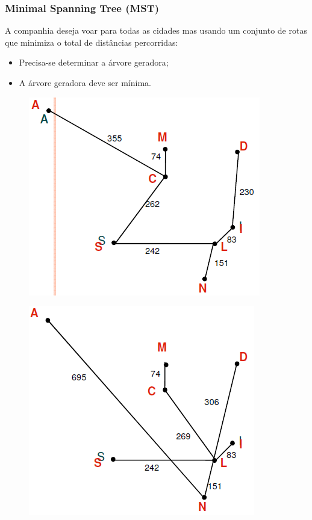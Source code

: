 \documentclass[hyperref={pdfpagelabels=false}]{beamer}
\begin{document}
\begin{frame}
\frametitle{Minimal Spanning Tree (MST)}

A companhia deseja voar para todas as cidades mas usando um conjunto de rotas que minimiza o total de distâncias percorridas:

\begin{itemize}
	\item Precisa-se determinar a árvore geradora;
	\item A árvore geradora deve ser mínima.
\end{itemize}

\begin{multicols}{2}
	\begin{figure}[!h]
		\centering
		\includegraphics[scale=0.4]{09}
		\label{09}
	\end{figure}

	\begin{figure}[!h]
		\centering
		\includegraphics[scale=0.4]{10}
		\label{10}
	\end{figure}
\end{multicols}

\end{frame}
\end{document}
